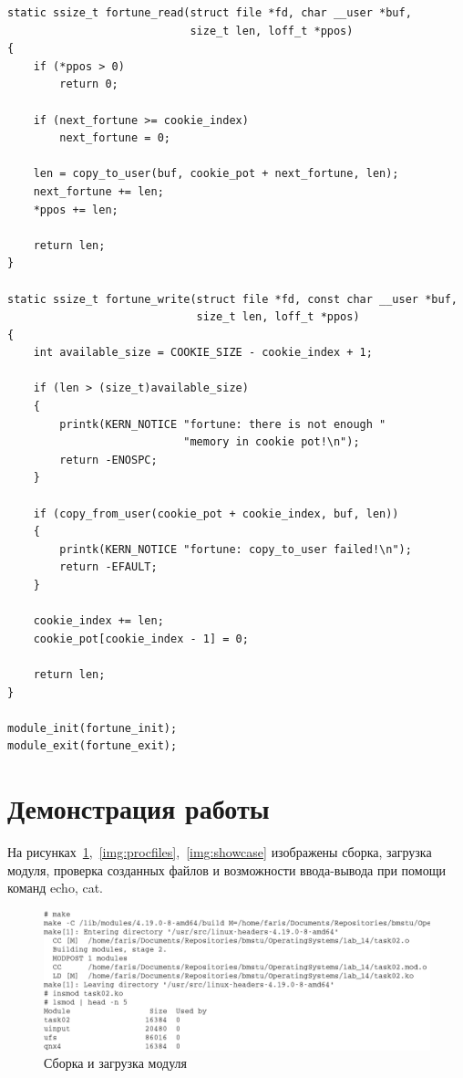\begin{lstlisting}[caption={Задание \textnumero2},label={lst:task02}]
static ssize_t fortune_read(struct file *fd, char __user *buf,
                            size_t len, loff_t *ppos)
{
    if (*ppos > 0)
        return 0;

    if (next_fortune >= cookie_index)
        next_fortune = 0;

    len = copy_to_user(buf, cookie_pot + next_fortune, len);
    next_fortune += len;
    *ppos += len;

    return len;
}

static ssize_t fortune_write(struct file *fd, const char __user *buf,
                             size_t len, loff_t *ppos)
{
    int available_size = COOKIE_SIZE - cookie_index + 1;

    if (len > (size_t)available_size)
    {
        printk(KERN_NOTICE "fortune: there is not enough "
                           "memory in cookie pot!\n");
        return -ENOSPC;
    }

    if (copy_from_user(cookie_pot + cookie_index, buf, len))
    {
        printk(KERN_NOTICE "fortune: copy_to_user failed!\n");
        return -EFAULT;
    }

    cookie_index += len;
    cookie_pot[cookie_index - 1] = 0;

    return len;
}

module_init(fortune_init);
module_exit(fortune_exit);
\end{lstlisting}

\section{Демонстрация работы}

На рисунках~\ref{img:moduleload},~\ref{img:procfiles},~\ref{img:showcase} изображены сборка, загрузка модуля, проверка созданных файлов и возможности ввода-вывода при помощи команд echo, cat.

\begin{figure}[H]
    \includegraphics[scale=0.5]{images/moduleload.png}
    \caption{Сборка и загрузка модуля}\label{img:moduleload}
\end{figure}

